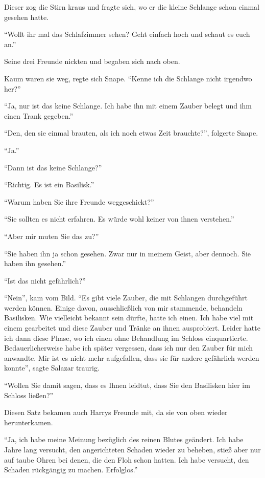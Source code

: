 Dieser zog die Stirn kraus und fragte sich, wo er die kleine Schlange schon einmal gesehen hatte.

\enquote{Wollt ihr mal das Schlafzimmer sehen? Geht einfach hoch und schaut es euch an.}

Seine drei Freunde nickten und begaben sich nach oben.

Kaum waren sie weg, regte sich Snape. \enquote{Kenne ich die Schlange nicht irgendwo her?}

\enquote{Ja, nur ist das keine Schlange. Ich habe ihn mit einem Zauber belegt und ihm einen Trank gegeben.}

\enquote{Den, den sie einmal brauten, als ich noch etwas Zeit brauchte?}, folgerte Snape.

\enquote{Ja.}

\enquote{Dann ist das keine Schlange?}

\enquote{Richtig. Es ist ein Basilisk.}

\enquote{Warum haben Sie ihre Freunde weggeschickt?}

\enquote{Sie sollten es nicht erfahren. Es würde wohl keiner von ihnen verstehen.}

\enquote{Aber mir muten Sie das zu?}

\enquote{Sie haben ihn ja schon gesehen. Zwar nur in meinem Geist, aber dennoch. Sie haben ihn gesehen.}

\enquote{Ist das nicht gefährlich?}

\enquote{Nein}, kam vom Bild. \enquote{Es gibt viele Zauber, die mit Schlangen durchgeführt werden können. Einige davon, ausschließlich von mir stammende, behandeln Basilisken. Wie vielleicht bekannt sein dürfte, hatte ich einen. Ich habe viel mit einem gearbeitet und diese Zauber und Tränke an ihnen ausprobiert. Leider hatte ich dann diese Phase, wo ich einen ohne Behandlung im Schloss einquartierte. Bedauerlicherweise habe ich später vergessen, dass ich nur den Zauber für mich anwandte. Mir ist es nicht mehr aufgefallen, dass sie für andere gefährlich werden konnte}, sagte Salazar traurig.

\enquote{Wollen Sie damit sagen, dass es Ihnen leidtut, dass Sie den Basilisken hier im Schloss ließen?}

Diesen Satz bekamen auch Harrys Freunde mit, da sie von oben wieder herunterkamen.

\enquote{Ja, ich habe meine Meinung bezüglich des reinen Blutes geändert. Ich habe Jahre lang versucht, den angerichteten Schaden wieder zu beheben, stieß aber nur auf taube Ohren bei denen, die den Floh schon hatten. Ich habe versucht, den Schaden rückgängig zu machen. Erfolglos.}

